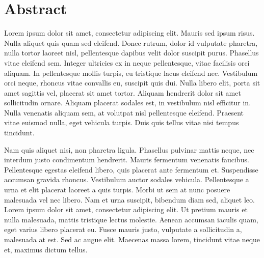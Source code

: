 \chapter*{Abstract}

Lorem ipsum dolor sit amet, consectetur adipiscing elit.
Mauris sed ipsum risus.
Nulla aliquet quis quam sed eleifend.
Donec rutrum, dolor id vulputate pharetra, nulla tortor laoreet nisl,
pellentesque dapibus velit dolor suscipit purus.
Phasellus vitae eleifend sem.
Integer ultricies ex in neque pellentesque, vitae facilisis orci aliquam.
In pellentesque mollis turpis, eu tristique lacus eleifend nec.
Vestibulum orci neque, rhoncus vitae convallis eu, suscipit quis dui.
Nulla libero elit, porta sit amet sagittis vel, placerat sit amet tortor.
Aliquam hendrerit dolor sit amet sollicitudin ornare.
Aliquam placerat sodales est, in vestibulum nisl efficitur in.
Nulla venenatis aliquam sem, at volutpat nisl pellentesque eleifend.
Praesent vitae euismod nulla, eget vehicula turpis.
Duis quis tellus vitae nisi tempus tincidunt.

Nam quis aliquet nisi, non pharetra ligula.
Phasellus pulvinar mattis neque, nec interdum justo condimentum hendrerit.
Mauris fermentum venenatis faucibus.
Pellentesque egestas eleifend libero, quis placerat ante fermentum et.
Suspendisse accumsan gravida rhoncus.
Vestibulum auctor sodales vehicula.
Pellentesque a urna et elit placerat laoreet a quis turpis.
Morbi ut sem at nunc posuere malesuada vel nec libero.
Nam et urna suscipit, bibendum diam sed, aliquet leo.
Lorem ipsum dolor sit amet, consectetur adipiscing elit.
Ut pretium mauris et nulla malesuada, mattis tristique lectus molestie.
Aenean accumsan iaculis quam, eget varius libero placerat eu.
Fusce mauris justo, vulputate a sollicitudin a, malesuada at est.
Sed ac augue elit.
Maecenas massa lorem, tincidunt vitae neque et, maximus dictum tellus.

